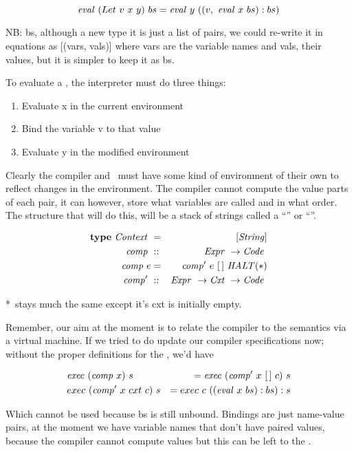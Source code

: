 \documentclass {article}
\begin{document}
\[\mathit{eval\ } (Let\ v\ x\ y)\ bs 
		= \mathit{eval\ }  y\ ((v,\ \mathit{eval\ }  x\ bs):bs) \]

NB: bs, although a new type it is just a list
of pairs, we could re-write it in equations as
[(vars, vals)] where vars are the variable names
and vals, their values,
but it is simpler to keep it as bs.

To evaluate a , the interpreter
must do three things:
\begin{enumerate}
	\item Evaluate x in the current environment
	\item Bind the variable v to that value
	\item Evaluate y in the modified environment
\end{enumerate}

Clearly the compiler and \vm\ must have some kind of
environment of their own to
reflect changes in the environment.
The compiler cannot compute the value
parts of each pair,
it can however, 
store what variables are called and in what order.
The structure that will do this, will be a 
stack of strings called a ``\Contextt'' or ``\Cxtt''.

\begin{eqnarray*}
	\textbf{type}\  \mathit{Context\ } &=& [\mathit{String}] \\
	\mathit{comp\ } &::& \mathit{Expr\ } \rightarrow \mathit{Code\ } \\
	\mathit{comp\ } e &=& \mathit{comp'\ }  e\ [\,]\ \mathit{HALT} (*)\\
	\mathit{comp'\ } &::& \mathit{Expr\ } \rightarrow \mathit{Cxt\ } \rightarrow \mathit{Code\ }
\end{eqnarray*}

*\comp\ stays much the same except it's cxt
	is initially empty.

Remember, our aim at the moment
is to relate the compiler to the
semantics via a virtual machine.
If we tried to do update our compiler 
specifications now; 
without the proper definitions
for the \vm, we'd have

\begin{eqnarray*}
&\mathit{exec\ } (\mathit{comp\ } x)\ s  
	&= \mathit{exec\ } (\mathit{comp'\ }  x\ [\,]\ c)\ s  \\
&exec\ (\mathit{comp'\ }  x\ cxt\ c)\ s  
	&= exec\ c\ ((\mathit{eval\ }  x\ bs) : bs) : s
\end{eqnarray*}

Which cannot be used
because bs is still unbound.
Bindings are just name-value pairs,
at the moment we have variable names
that don't have paired values,
because the compiler cannot compute values
but this can be left to the \vm.
\end{document}
